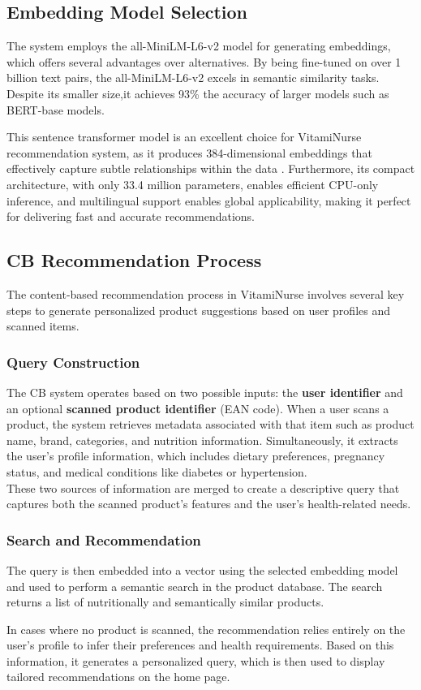 \subsection{Embedding Model Selection}
\par The system employs the all-MiniLM-L6-v2 model for generating embeddings, which offers several advantages over alternatives. 
By being fine-tuned on over 1 billion text pairs, the all-MiniLM-L6-v2 excels in semantic similarity tasks. 
Despite its smaller size,it achieves 93\% the accuracy of larger models such as BERT-base models. 

\par This sentence transformer model is an excellent choice for VitamiNurse recommendation system, as it produces 384-dimensional embeddings that effectively capture subtle relationships within the data \cite{allMiniLML12}. Furthermore, its compact architecture, with only 33.4 million parameters, enables
efficient CPU-only inference, and multilingual support enables global applicability, making it
perfect for delivering fast and accurate recommendations.


\subsection{CB Recommendation Process}
 The content-based recommendation process in VitamiNurse involves several key steps to generate personalized product suggestions based on user profiles and scanned items.
\subsubsection{Query Construction}
\par The CB system operates based on two possible inputs: the \textbf{user identifier} and an optional \textbf{scanned product identifier} (EAN code). When a user scans a product, the system retrieves metadata associated with that item such as product name, brand, categories, and nutrition information. Simultaneously, it extracts the user’s profile information, which includes dietary preferences, pregnancy status, and medical conditions like diabetes or hypertension.\\
These two sources of information are merged to create a descriptive query that captures both the scanned product’s features and the user's health-related needs. 

\subsubsection{Search and Recommendation}
The query is then embedded into a vector using the selected embedding model and used to perform a semantic search in the product database. The search returns a list of nutritionally and semantically similar products.
\par In cases where no product is scanned, the recommendation relies entirely on the user’s profile to infer their preferences and health requirements. Based on this information, it generates a personalized query, which is then used to display tailored recommendations on the home page.


